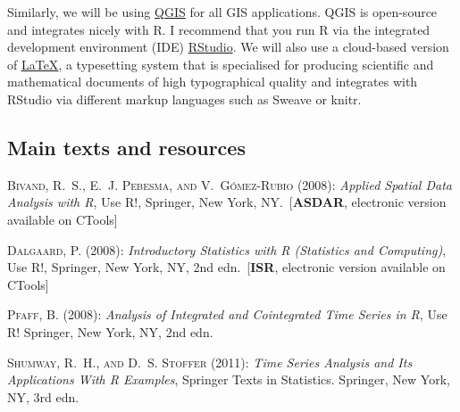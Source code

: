 Similarly, we will be using \href{http://www.qgis.org/}{\textsf{QGIS}} for all GIS applications. \textsf{QGIS} is open-source and integrates nicely with \textsf{R}. I recommend that you run \textsf{R} via the integrated development environment (IDE) \href{http://rstudio.org/}{RStudio}. We will also use a cloud-based version of \href{https://www.sharelatex.com}{\LaTeX}, a typesetting system that is specialised for producing scientific and mathematical documents of high typographical quality and integrates with RStudio via different markup languages such as \textsf{Sweave} or \textsf{knitr}.


\subsection{Main texts and resources}

\renewcommand\bibname{\normalsize{Recommended readings}}
\begin{thebibliography}{}

 \textsc{Bivand, R.~S., E.~J. Pebesma,  {\small and} V.~G\'{o}mez-Rubio} (2008): \emph{Applied Spatial Data Analysis with R}, Use R!, Springer, New York, NY.~[\textcolor[rgb]{0.00,0.50,0.00}{\textbf{\textsf{ASDAR}}}, electronic version available on CTools]

 \textsc{Dalgaard, P.}  (2008): \emph{Introductory Statistics with R (Statistics and Computing)}, Use R!, Springer, New York, NY, 2nd edn.~[\textcolor[rgb]{0.00,0.50,0.00}{\textbf{\textsf{ISR}}}, electronic version available on CTools]

\textsc{Pfaff, B.}  (2008): \emph{Analysis of Integrated and Cointegrated Time Series in R}, Use R! Springer, New York, NY, 2nd edn.

\textsc{Shumway, R.~H.,  {\small and} D.~S. Stoffer}  (2011): \emph{Time Series Analysis and Its Applications With R Examples}, Springer Texts in Statistics. Springer, New York, NY, 3rd edn.
\end{thebibliography}

